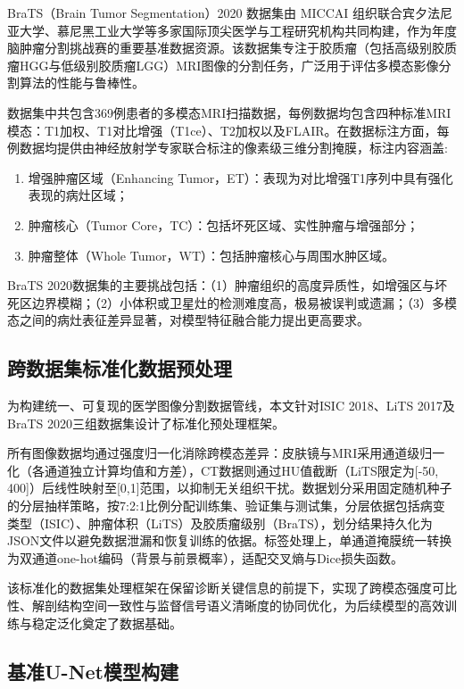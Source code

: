 BraTS（Brain Tumor Segmentation）2020 数据集由 MICCAI 组织联合宾夕法尼亚大学、慕尼黑工业大学等多家国际顶尖医学与工程研究机构共同构建，作为年度脑肿瘤分割挑战赛的重要基准数据资源\cite{menze2015}。该数据集专注于胶质瘤（包括高级别胶质瘤HGG与低级别胶质瘤LGG）MRI图像的分割任务，广泛用于评估多模态影像分割算法的性能与鲁棒性。

数据集中共包含369例患者的多模态MRI扫描数据，每例数据均包含四种标准MRI模态：T1加权、T1对比增强（T1ce）、T2加权以及FLAIR。在数据标注方面，每例数据均提供由神经放射学专家联合标注的像素级三维分割掩膜，标注内容涵盖:

\begin{enumerate}
    \item 增强肿瘤区域（Enhancing Tumor，ET）：表现为对比增强T1序列中具有强化表现的病灶区域；
    \item 肿瘤核心（Tumor Core，TC）：包括坏死区域、实性肿瘤与增强部分；
    \item 肿瘤整体（Whole Tumor，WT）：包括肿瘤核心与周围水肿区域。
\end{enumerate}

BraTS 2020数据集的主要挑战包括：（1）肿瘤组织的高度异质性，如增强区与坏死区边界模糊；（2）小体积或卫星灶的检测难度高，极易被误判或遗漏；（3）多模态之间的病灶表征差异显著，对模型特征融合能力提出更高要求。


\subsection{跨数据集标准化数据预处理}

为构建统一、可复现的医学图像分割数据管线，本文针对ISIC 2018、LiTS 2017及BraTS 2020三组数据集设计了标准化预处理框架。

所有图像数据均通过强度归一化消除跨模态差异：皮肤镜与MRI采用通道级归一化（各通道独立计算均值和方差），CT数据则通过HU值截断（LiTS限定为[-50, 400]）后线性映射至[0,1]范围，以抑制无关组织干扰。数据划分采用固定随机种子的分层抽样策略，按7:2:1比例分配训练集、验证集与测试集，分层依据包括病变类型（ISIC）、肿瘤体积（LiTS）及胶质瘤级别（BraTS），划分结果持久化为JSON文件以避免数据泄漏和恢复训练的依据。标签处理上，单通道掩膜统一转换为双通道one-hot编码（背景与前景概率），适配交叉熵与Dice损失函数。  

该标准化的数据集处理框架在保留诊断关键信息的前提下，实现了跨模态强度可比性、解剖结构空间一致性与监督信号语义清晰度的协同优化，为后续模型的高效训练与稳定泛化奠定了数据基础。

\subsection{基准U-Net模型构建}

